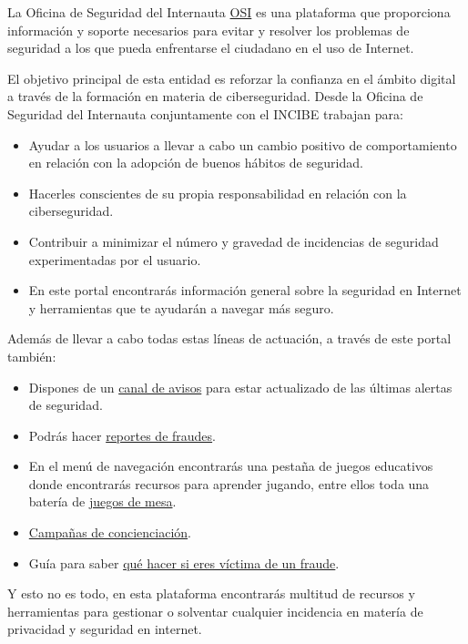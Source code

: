 \documentclass[
  a4paper,
  openany]{book}
\begin{document}
La Oficina de Seguridad del Internauta \href{https://www.osi.es/}{OSI} es una plataforma que proporciona información y soporte necesarios para evitar y resolver los problemas de seguridad a los que pueda enfrentarse el ciudadano en el uso de Internet.

El objetivo principal de esta entidad es reforzar la confianza en el ámbito digital a través de la formación en materia de ciberseguridad. Desde la Oficina de Seguridad del Internauta conjuntamente con el INCIBE trabajan para:

\begin{itemize}
\item
  Ayudar a los usuarios a llevar a cabo un cambio positivo de comportamiento en relación con la adopción de buenos hábitos de seguridad.
\item
  Hacerles conscientes de su propia responsabilidad en relación con la ciberseguridad.
\item
  Contribuir a minimizar el número y gravedad de incidencias de seguridad experimentadas por el usuario.
\item
  En este portal encontrarás información general sobre la seguridad en Internet y herramientas que te ayudarán a navegar más seguro.
\end{itemize}

Además de llevar a cabo todas estas líneas de actuación, a través de este portal también:

\begin{itemize}
\item
  Dispones de un \href{https://www.osi.es/es/actualidad/avisos}{canal de avisos} para estar actualizado de las últimas alertas de seguridad.
\item
  Podrás hacer \href{https://www.osi.es/es/reporte-de-fraude}{reportes de fraudes}.
\item
  En el menú de navegación encontrarás una pestaña de juegos educativos donde encontrarás recursos para aprender jugando, entre ellos toda una batería de \href{https://www.osi.es/es/juegos-mesa}{juegos de mesa}.
\item
  \href{https://www.osi.es/es/campanas}{Campañas de concienciación}.
\item
  Guía para saber \href{https://www.osi.es/es/que-hacer-si-eres-victima-de-un-fraude}{qué hacer si eres víctima de un fraude}.
\end{itemize}

Y esto no es todo, en esta plataforma encontrarás multitud de recursos y herramientas para gestionar o solventar cualquier incidencia en matería de privacidad y seguridad en internet.
\end{document}
